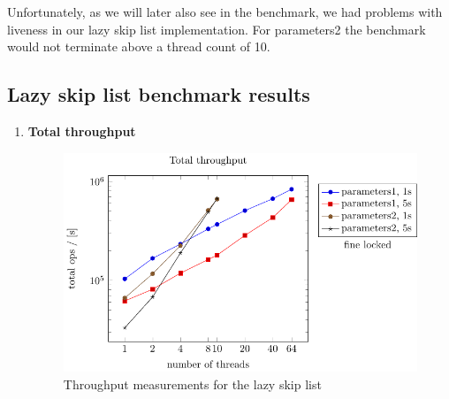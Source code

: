 \documentclass{article}
\begin{document}
Unfortunately, as we will later also see in the benchmark, we had problems with liveness in our lazy skip list implementation.
For parameters2 the benchmark would not terminate above a thread count of 10.

\subsection{Lazy skip list benchmark results}

\begin{enumerate}
    \item \textbf{Total throughput}
    \begin{figure}[H]
        \centering
        \includegraphics{../plots/fine_throughput.pdf}
        \caption{ Throughput measurements for the lazy skip list}
       

\end{figure}
\end{enumerate}
\end{document}
